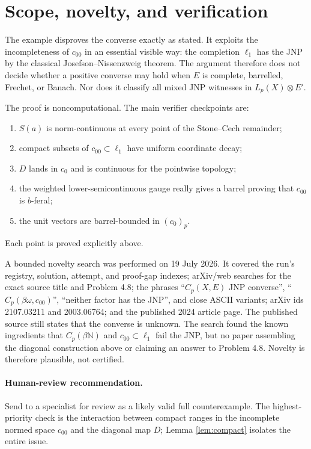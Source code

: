 \documentclass[11pt]{article}
\newcommand{\N}{\mathbb N}
\newcommand{\czerop}{(c_0)_p}
\begin{document}
\section{Scope, novelty, and verification}

The example disproves the converse exactly as stated.  It exploits the
incompleteness of $c_{00}$ in an essential visible way: the completion
$\ell_1$ has the JNP by the classical Josefson--Nissenzweig theorem.  The
argument therefore does not decide whether a positive converse may hold when
$E$ is complete, barrelled, Frechet, or Banach.  Nor does it classify all
mixed JNP witnesses in $L_p(X)\otimes E'$.

The proof is noncomputational.  The main verifier checkpoints are:
\begin{enumerate}[label=\textup{(\arabic*)},itemsep=0.25em]
  \item $S(a)$ is norm-continuous at every point of the Stone--Cech
        remainder;
  \item compact subsets of $c_{00}\subset\ell_1$ have uniform coordinate
        decay;
  \item $D$ lands in $c_0$ and is continuous for the pointwise topology;
  \item the weighted lower-semicontinuous gauge really gives a barrel proving
        that $c_{00}$ is $b$-feral;
  \item the unit vectors are barrel-bounded in $\czerop$.
\end{enumerate}
Each point is proved explicitly above.

A bounded novelty search was performed on 19 July 2026.  It covered the run's
registry, solution, attempt, and proof-gap indexes; arXiv/web searches for the
exact source title and Problem 4.8; the phrases ``$C_p(X,E)$ JNP converse'',
``$C_p(\beta\omega,c_{00})$'', ``neither factor has the JNP'', and close
ASCII variants; arXiv ids 2107.03211 and 2003.06764; and the published 2024
article page.  The published source still states that the converse is
unknown.  The search found the known ingredients that $C_p(\beta\N)$ and
$c_{00}\subset\ell_1$ fail the JNP, but no paper assembling the diagonal
construction above or claiming an answer to Problem 4.8.  Novelty is therefore
plausible, not certified.

\paragraph{Human-review recommendation.}
Send to a specialist for review as a likely valid full counterexample.  The
highest-priority check is the interaction between compact ranges in the
incomplete normed space $c_{00}$ and the diagonal map $D$; Lemma
\ref{lem:compact} isolates the entire issue.
\end{document}
